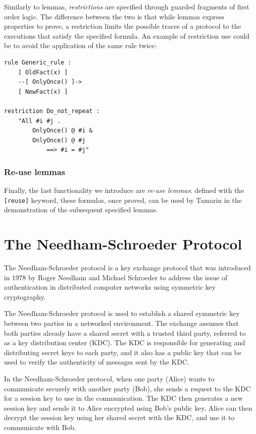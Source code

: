 \documentclass[fleqn,10pt]{SelfArx} %
\begin{document}
Similarly to lemmas, \textit{restrictions} are specified through guarded fragments of first order logic. The difference between the two is that while lemmas express properties to prove, a restriction limits the possible traces of a protocol to the executions that satisfy the specified formula. An example of restriction use could be to avoid the application of the same rule twice:

\begin{lstlisting}[language=Tamarin]
rule Generic_rule :
    [ OldFact(x) ]
    --[ OnlyOnce() ]->
    [ NewFact(x) ]

restriction Do_not_repeat :
    "All #i #j .
        OnlyOnce() @ #i &
        OnlyOnce() @ #j
            ==> #i = #j"
\end{lstlisting}

\subsubsection{Re-use lemmas}

Finally, the last functionality we introduce are \textit{re-use lemmas}: defined with the \lstinline|[reuse]| keyword, these formulas, once proved, can be used by Tamarin in the demonstration of the subsequent specified lemmas.

\section{The Needham-Schroeder Protocol}

The Needham-Schroeder protocol is a key exchange protocol that was introduced in 1978 by Roger Needham and Michael Schroeder \cite{needhamschroeder} to address the issue of authentication in distributed computer networks using symmetric key cryptography.

The Needham-Schroeder protocol is used to establish a shared symmetric key between two parties in a networked environment. The exchange assumes that both parties already have a shared secret with a trusted third party, referred to as a key distribution center (KDC). The KDC is responsible for generating and distributing secret keys to each party, and it also has a public key that can be used to verify the authenticity of messages sent by the KDC.

In the Needham-Schroeder protocol, when one party (Alice) wants to communicate securely with another party (Bob), she sends a request to the KDC for a session key to use in the communication. The KDC then generates a new session key and sends it to Alice encrypted using Bob's public key. Alice can then decrypt the session key using her shared secret with the KDC, and use it to communicate with Bob.
\end{document}
